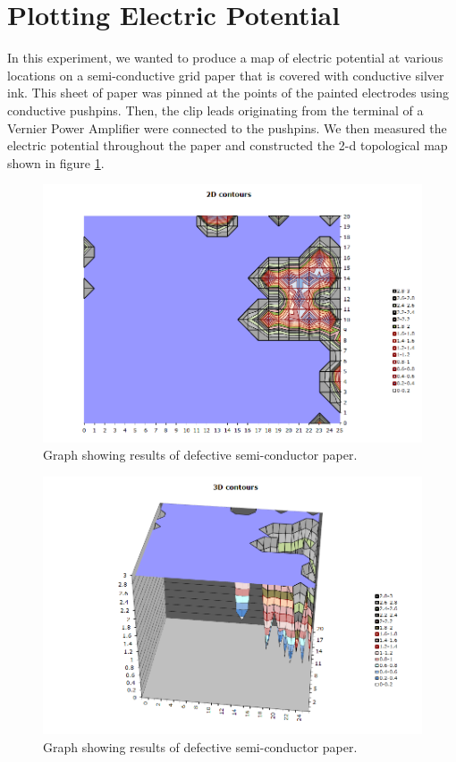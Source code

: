 \documentclass[oneside,12pt]{amsart}
\begin{document}
	\section{Plotting Electric Potential}
		In this experiment, we wanted to produce a map of electric potential at various locations on a semi-conductive grid paper that is covered with conductive silver ink. This sheet of paper was pinned at the points of the painted electrodes using conductive pushpins. Then, the clip leads originating from the terminal of a Vernier Power Amplifier were connected to the pushpins. We then measured the electric potential throughout the paper and constructed the 2-d topological map shown in figure \ref{badGraph}.\\
		
		\begin{figure}[h]
		 \includegraphics[width=\smallgraph,scale=0.01]{2d.png}
		\caption{Graph showing results of defective semi-conductor paper.}
		\label{badGraph}
		\end{figure}
	
		\begin{figure}[h]
		\includegraphics[width=\smallgraph,scale=0.01]{image.png}
		\caption{Graph showing results of defective semi-conductor paper.}
		\label{3d}
	\end{figure}
	
\end{document}
